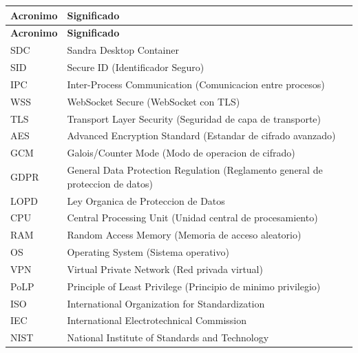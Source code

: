 \begin{longtable}{p{3cm}p{10cm}}
\toprule
\textbf{Acronimo} & \textbf{Significado} \\
\midrule
\endfirsthead
\toprule
\textbf{Acronimo} & \textbf{Significado} \\
\midrule
\endhead
\bottomrule
\endfoot

SDC & Sandra Desktop Container \\
SID & Secure ID (Identificador Seguro) \\
IPC & Inter-Process Communication (Comunicacion entre procesos) \\
WSS & WebSocket Secure (WebSocket con TLS) \\
TLS & Transport Layer Security (Seguridad de capa de transporte) \\
AES & Advanced Encryption Standard (Estandar de cifrado avanzado) \\
GCM & Galois/Counter Mode (Modo de operacion de cifrado) \\
GDPR & General Data Protection Regulation (Reglamento general de proteccion de datos) \\
LOPD & Ley Organica de Proteccion de Datos \\
CPU & Central Processing Unit (Unidad central de procesamiento) \\
RAM & Random Access Memory (Memoria de acceso aleatorio) \\
OS & Operating System (Sistema operativo) \\
VPN & Virtual Private Network (Red privada virtual) \\
PoLP & Principle of Least Privilege (Principio de minimo privilegio) \\
ISO & International Organization for Standardization \\
IEC & International Electrotechnical Commission \\
NIST & National Institute of Standards and Technology \\

\end{longtable}

